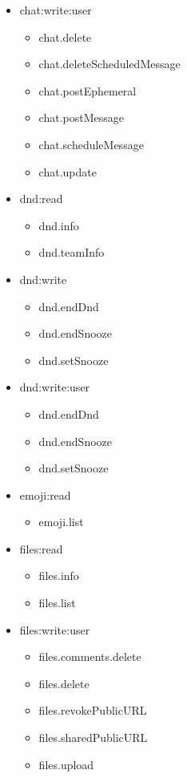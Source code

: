 \begin{multicols}{2}
\begin{itemize}
	\item chat:write:user
	\begin{itemize}
		\item chat.delete
		\item chat.deleteScheduledMessage
		\item chat.postEphemeral
		\item chat.postMessage
		\item chat.scheduleMessage
		\item chat.update
	\end{itemize}
	
	\item dnd:read
	\begin{itemize}
		\item dnd.info
		\item dnd.teamInfo
	\end{itemize}
	
	\item dnd:write
	\begin{itemize}
		\item dnd.endDnd
		\item dnd.endSnooze
		\item dnd.setSnooze
	\end{itemize}
	
	\item dnd:write:user
	\begin{itemize}
		\item dnd.endDnd
		\item dnd.endSnooze
		\item dnd.setSnooze
	\end{itemize}
	
	\item emoji:read
	\begin{itemize}
		\item emoji.list
	\end{itemize}
	
	\item files:read
	\begin{itemize}
		\item files.info
		\item files.list
	\end{itemize}
	
	\item files:write:user
	\begin{itemize}
		\item files.comments.delete
		\item files.delete
		\item files.revokePublicURL
		\item files.sharedPublicURL
		\item files.upload
	\end{itemize}
	

\end{itemize}
\end{multicols}
